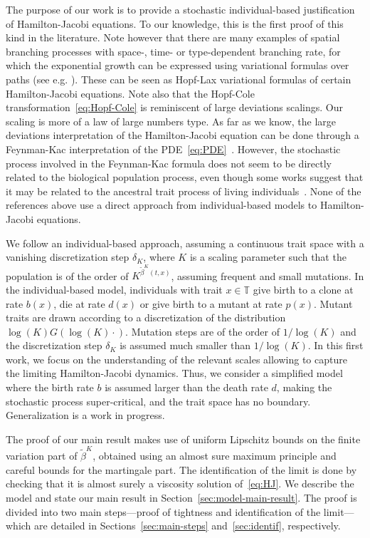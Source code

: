\documentclass[JEP,XML,SOM,Unicode,published]{cedram}
\theoremstyle{plain}
\theoremstyle{remark}
\begin{document}
The purpose of our work is to provide a stochastic individual-based justification of Hamilton-Jacobi equations. To our knowledge, this is the first proof of this kind in the literature. Note however that there are many examples of spatial branching processes with space-, time- or type-dependent branching rate, for which the exponential growth can be expressed using variational formulas over paths (see e.g. \cite{biggins,berestyckibrunetharrisharrisroberts,callegaroroberts,mallein,maillardraoultourniaire}). These can be seen as Hopf-Lax variational formulas of certain Hamilton-Jacobi equations.
Note also that the Hopf-Cole transformation~\eqref{eq:Hopf-Cole} is reminiscent of large deviations scalings. Our scaling is more of a law of large numbers type. As far as we know, the large deviations interpretation of the Hamilton-Jacobi equation can be done through a Feynman-Kac interpretation of the PDE~\eqref{eq:PDE}~\cite{Champagnat-Henry-2019}. However, the stochastic process involved in the Feynman-Kac formula does not seem to be directly related to the biological population process, even though some works suggest that it may be related to the ancestral trait process of living individuals~\cite{foriengarnierpatout}. None of the references above use a direct approach from individual-based models to Hamilton-Jacobi equations.

We follow an individual-based approach, assuming a continuous trait space with a vanishing discretization step $\delta_K$, where $K$ is a scaling parameter such that the population is of the order of $K^{\widetilde{\beta}^K(t,x)}$, assuming frequent and small mutations. In the individual-based model, individuals with trait $x\in\mathbb{T}$ give birth to a clone at rate $b(x)$, die at rate $d(x)$ or give birth to a mutant at rate $p(x)$. Mutant traits are drawn according to a discretization of the distribution $\log (K) G(\log (K) \cdot)$. Mutation steps are of the order of $1/\log (K)$ and the discretization step $\delta_K$ is assumed much smaller than $1/\log (K)$. In this first work, we focus on the understanding of the relevant scales allowing to capture the limiting Hamilton-Jacobi dynamics. Thus, we consider a simplified model where the birth rate $b$ is assumed larger than the death rate $d$, making the stochastic process super-critical, and the trait space has no boundary. Generalization is a work in progress.

The proof of our main result makes use of uniform Lipschitz bounds on the finite variation part of $\widetilde{\beta}^K$, obtained using an almost sure maximum principle and careful bounds for the martingale part. The identification of the limit is done by checking that it is almost surely a viscosity solution of~\eqref{eq:HJ}. We describe the model and state our main result in Section~\ref{sec:model-main-result}. The proof is divided into two main steps---proof of tightness and identification of the limit---which are detailed in Sections~\ref{sec:main-steps} and~\ref{sec:identif}, respectively.
\end{document}
